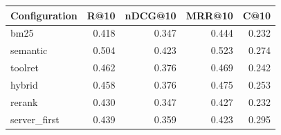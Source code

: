 \begin{tabular}{lrrrr}\toprule
Configuration & R@10 & nDCG@10 & MRR@10 & C@10\\\midrule
bm25 & 0.418 & 0.347 & 0.444 & 0.232 \\
semantic & 0.504 & 0.423 & 0.523 & 0.274 \\
toolret & 0.462 & 0.376 & 0.469 & 0.242 \\
hybrid & 0.458 & 0.376 & 0.475 & 0.253 \\
rerank & 0.430 & 0.347 & 0.427 & 0.232 \\
server\_first & 0.439 & 0.359 & 0.423 & 0.295 \\
\bottomrule\end{tabular}
